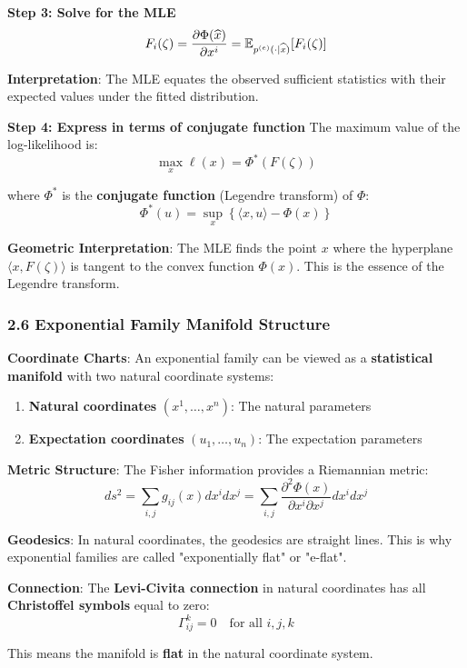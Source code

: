 \documentclass{amsart}
\let\originalmathbb\mathbb
\renewcommand{\mathbb}[1]{%
    \ifstrequal{#1}{1}{\mathbbm{#1}}{\originalmathbb{#1}}%
}
\theoremstyle{plain}
\theoremstyle{definition}
\theoremstyle{remark}
\begin{document}
\textbf{Step 3: Solve for the MLE}
\[
F_i(\zeta) = \frac{\partial \Phi(\widehat{x})}{\partial x^i} = \mathbb{E}_{p^{(e)}(\cdot \mid \widehat{x})}[F_i(\zeta)]
\]

\textbf{Interpretation}: The MLE equates the observed sufficient statistics with their expected values under the fitted distribution.

\textbf{Step 4: Express in terms of conjugate function}
The maximum value of the log-likelihood is:
\[
\max_x \ell(x) = \Phi^{*}(F(\zeta))
\]

where $\Phi^{*}$ is the \textbf{conjugate function} (Legendre transform) of $\Phi$:
\[
\Phi^{*}(u) = \sup_{x} \left\{ \langle x, u \rangle - \Phi(x) \right\}
\]

\textbf{Geometric Interpretation}: The MLE finds the point $x$ where the hyperplane $\langle x, F(\zeta) \rangle$ is tangent to the convex function $\Phi(x)$. This is the essence of the Legendre transform.

\subsubsection{2.6 Exponential Family Manifold Structure}

\textbf{Coordinate Charts}: An exponential family can be viewed as a \textbf{statistical manifold} with two natural coordinate systems:

\begin{enumerate}
	\item \textbf{Natural coordinates} $(x^1, \ldots, x^n)$: The natural parameters
	\item \textbf{Expectation coordinates} $(u_1, \ldots, u_n)$: The expectation parameters
\end{enumerate}

\textbf{Metric Structure}: The Fisher information provides a Riemannian metric:
\[
ds^2 = \sum_{i,j} g_{ij}(x) dx^i dx^j = \sum_{i,j} \frac{\partial^2 \Phi(x)}{\partial x^i \partial x^j} dx^i dx^j
\]

\textbf{Geodesics}: In natural coordinates, the geodesics are straight lines. This is why exponential families are called "exponentially flat" or "e-flat".

\textbf{Connection}: The \textbf{Levi-Civita connection} in natural coordinates has all \textbf{Christoffel symbols} equal to zero:
\[
\Gamma_{ij}^k = 0 \quad \text{for all } i, j, k
\]

This means the manifold is \textbf{flat} in the natural coordinate system.
\end{document}
